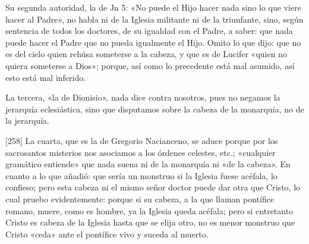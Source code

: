 Su segunda autoridad, la de Jn 5: «No puede el Hijo hacer nada sino lo que viere hacer al Padre», no habla ni de la Iglesia militante ni de la triunfante, sino, según sentencia de todos los doctores, de su igualdad con el Padre, a saber: que nada puede hacer el Padre que no pueda igualmente el Hijo. Omito lo que dijo: que no es del cielo quien rehúsa someterse a la cabeza, y que es de Lucifer «quien no quiera someterse a Dios»; porque, así como lo precedente está mal asumido, así esto está mal inferido.

La tercera, «la de Dionisio», nada dice contra nosotros, pues no negamos la jerarquía eclesiástica, sino que disputamos sobre la cabeza de la monarquía, no de la jerarquía.

[258] La cuarta, que es la de Gregorio Nacianceno, se aduce porque por los sacrosantos misterios nos asociamos a los órdenes celestes, etc.; «cualquier gramático entiende» que nada suena ni de la monarquía ni «de la cabeza». En cuanto a lo que añadió: que sería un monstruo si la Iglesia fuese acéfala, lo confieso; pero esta cabeza ni el mismo señor doctor puede dar otra que Cristo, lo cual pruebo evidentemente: porque si su cabeza, a la que llaman pontífice romano, muere, como es hombre, ya la Iglesia queda acéfala; pero si entretanto Cristo es cabeza de la Iglesia hasta que se elija otro, no es menor monstruo que Cristo «ceda» ante el pontífice vivo y suceda al muerto.


